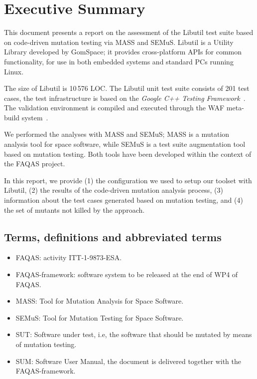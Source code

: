 
\chapter{Executive Summary}

This document presents a report on the assessment of the Libutil test suite based on code-driven mutation testing via MASS and SEMuS. 
Libutil is a Utility Library developed by GomSpace; it provides cross-platform APIs for common functionality, for use in both embedded systems and standard PCs running Linux. 


The size of Libutil is 10\,576 LOC. The Libutil unit test suite consists of 201 test cases, the test infrastructure is based on the \emph{Google C++ Testing Framework}~\cite{googletest}. The validation environment is compiled and executed through the WAF meta-build system~\cite{waf}.


We performed the analyses with MASS and SEMuS; MASS is a mutation analysis tool for space software, while SEMuS is a test suite augmentation tool based on mutation testing. Both tools have been developed within the context of the FAQAS project.

In this report, we provide (1) the configuration we used to setup our toolset with Libutil, (2) the results of the code-driven mutation analysis process, (3) information about the test cases generated based on mutation testing, and  (4) the set of mutants not killed by the approach.




\section{Terms, definitions and abbreviated terms}

\begin{itemize}
\item{FAQAS}: activity ITT-1-9873-ESA.
\item{FAQAS-framework}: software system to be released at the end of WP4 of FAQAS.
\item{MASS}: Tool for Mutation Analysis for Space Software.
\item{SEMuS}: Tool for Mutation Testing for Space Software.
\item{SUT}: Software under test, i.e, the software that should be mutated by means of mutation testing.
\item{SUM}: Software User Manual, the document is delivered together with the FAQAS-framework.

\end{itemize}

\clearpage
